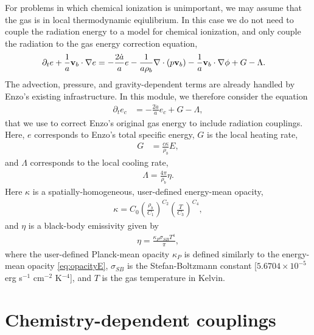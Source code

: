 \documentclass[letterpaper,10pt]{article}
\renewcommand{\(}{\left(}
\renewcommand{\)}{\right)}
\newcommand{\vb}{{\bf v}_b}
\newcommand{\rhob}{\rho_b}
\begin{document}
For problems in which chemical ionization is unimportant, we may
assume that the gas is in local thermodynamic eqiulibrium.  In this
case we do not need to couple the radiation energy to a model for
chemical ionization, and only couple the radiation to the gas energy
correction equation, 
\begin{align}
  \label{eq:cons_energy}
  \partial_t e + \frac1a\vb\cdot\nabla e &=
    - \frac{2\dot{a}}{a}e
    - \frac{1}{a\rhob}\nabla\cdot\left(p\vb\right) 
    - \frac1a\vb\cdot\nabla\phi + G - \Lambda.
\end{align}
The advection, pressure, and gravity-dependent terms are already
handled by Enzo's existing infrastructure.  In this module, we
therefore consider the equation
\begin{align}
  \label{eq:cons_energy_correction}
  \partial_t e_c &= - \frac{2\dot{a}}{a}e_c + G - \Lambda,
\end{align}
that we use to correct Enzo's original gas energy to include radiation
couplings.  Here, $e$ corresponds to Enzo's total specific energy, $G$
is the local heating rate,
\begin{align}
\label{eq:G_LTE}
  G &= \frac{c \kappa}{\rhob} E,
\end{align}
and $\Lambda$ corresponds to the local cooling rate,
\begin{align}
\label{eq:Lambda_LTE}
  \Lambda = \frac{4\pi}{\rhob} \eta.
\end{align}
Here $\kappa$ is a spatially-homogeneous, user-defined energy-mean
opacity, 
\begin{align}
\label{eq:opacityE}
  \kappa = C_0 \left(\frac{\rhob}{C_1}\right)^{C_2}
    \left(\frac{T}{C_3}\right)^{C_4}, 
\end{align}
and $\eta$ is a black-body emissivity given by
\begin{align}
\label{eq:etaBB}
  \eta = \frac{\kappa_P\sigma_{SB}T^4}{\pi},
\end{align}
where the user-defined Planck-mean opacity $\kappa_P$ is defined
similarly to the energy-mean opacity \eqref{eq:opacityE},
$\sigma_{SB}$ is the Stefan-Boltzmann constant [$5.6704\times 10^{-5}$
erg s$^{-1}$ cm$^{-2}$ K$^{-4}$], and $T$ is the gas temperature in
Kelvin.


\section{Chemistry-dependent couplings}
\label{sec:chem_model}
\end{document}

